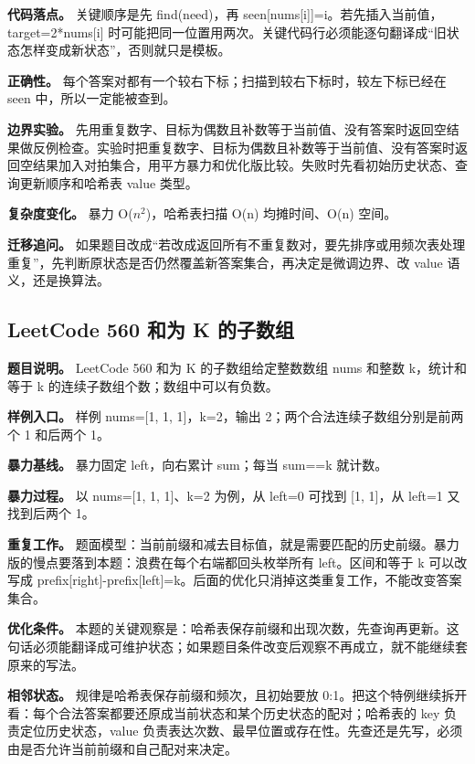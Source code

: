 \textbf{代码落点。} 关键顺序是先 find(need)，再 seen[nums[i]]=i。若先插入当前值，target=2*nums[i] 时可能把同一位置用两次。关键代码行必须能逐句翻译成“旧状态怎样变成新状态”，否则就只是模板。

\textbf{正确性。} 每个答案对都有一个较右下标；扫描到较右下标时，较左下标已经在 seen 中，所以一定能被查到。

\textbf{边界实验。} 先用重复数字、目标为偶数且补数等于当前值、没有答案时返回空结果做反例检查。实验时把重复数字、目标为偶数且补数等于当前值、没有答案时返回空结果加入对拍集合，用平方暴力和优化版比较。失败时先看初始历史状态、查询更新顺序和哈希表 value 类型。

\textbf{复杂度变化。} 暴力 O(\ensuremath{n^{2}})，哈希表扫描 O(n) 均摊时间、O(n) 空间。

\textbf{迁移追问。} 如果题目改成“若改成返回所有不重复数对，要先排序或用频次表处理重复”，先判断原状态是否仍然覆盖新答案集合，再决定是微调边界、改 value 语义，还是换算法。

\subsection{LeetCode 560 和为 K 的子数组}

\textbf{题目说明。} LeetCode 560 和为 K 的子数组给定整数数组 nums 和整数 k，统计和等于 k 的连续子数组个数；数组中可以有负数。

\textbf{样例入口。} 样例 nums=[1, 1, 1]，k=2，输出 2；两个合法连续子数组分别是前两个 1 和后两个 1。

\textbf{暴力基线。} 暴力固定 left，向右累计 sum；每当 sum==k 就计数。

\textbf{暴力过程。} 以 nums=[1, 1, 1]、k=2 为例，从 left=0 可找到 [1, 1]，从 left=1 又找到后两个 1。

\textbf{重复工作。} 题面模型：当前前缀和减去目标值，就是需要匹配的历史前缀。暴力版的慢点要落到本题：浪费在每个右端都回头枚举所有 left。区间和等于 k 可以改写成 prefix[right]-prefix[left]=k。后面的优化只消掉这类重复工作，不能改变答案集合。

\textbf{优化条件。} 本题的关键观察是：哈希表保存前缀和出现次数，先查询再更新。这句话必须能翻译成可维护状态；如果题目条件改变后观察不再成立，就不能继续套原来的写法。

\textbf{相邻状态。} 规律是哈希表保存前缀和频次，且初始要放 0:1。把这个特例继续拆开看：每个合法答案都要还原成当前状态和某个历史状态的配对；哈希表的 key 负责定位历史状态，value 负责表达次数、最早位置或存在性。先查还是先写，必须由是否允许当前前缀和自己配对来决定。

